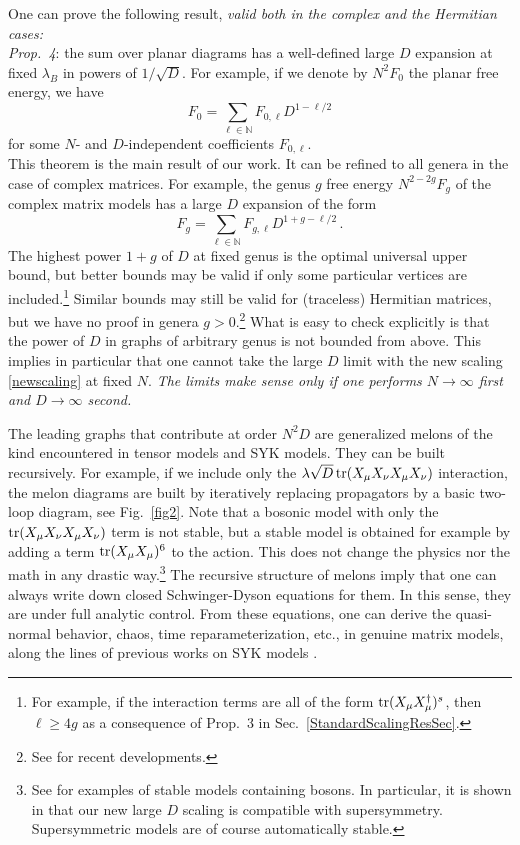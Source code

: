 \documentclass[12pt]{article}
\numberwithin{equation}{section}
\def\be{\begin{equation}}\def\ee{\end{equation}}
\begin{document}
One can prove the following result, \emph{valid both in the complex and the Hermitian cases:}\smallskip\\
\noindent\emph{Prop.\ 4}: the sum over planar diagrams has a well-defined large $D$ expansion at fixed $\lambda_{B}$ in powers of $1/\sqrt{D}$. For example, if we denote by $N^{2}F_{0}$ the planar free energy, we have
%
\be\label{F0exp} F_{0}=\sum_{\ell\in\mathbb N}F_{0,\ell}D^{1-\ell/2}\ee
%
for some $N$- and $D$-independent coefficients $F_{0,\ell}$.\smallskip\\
This theorem is the main result of our work. It can be refined to all genera in the case of complex matrices. For example, the genus $g$ free energy $N^{2-2g}F_{g}$ of the complex matrix models has a large $D$ expansion of the form
%
\be\label{Fgexpnew} F_{g}=\sum_{\ell\in\mathbb N}F_{g,\ell}D^{1+g-\ell/2}\, .\ee
%
The highest power $1+g$ of $D$ at fixed genus is the optimal universal upper bound, but better bounds may be valid if only some particular vertices are included.\footnote{For example, if the interaction terms are all of the form $\mathop{\rm tr}\nolimits (X_{\mu}X_{\mu}^{\dagger})^{s}$, then $\ell\geq 4g$ as a consequence of Prop.\ 3 in Sec.\ \ref{StandardScalingResSec}.} Similar bounds may still be valid for (traceless) Hermitian matrices, but we have no proof in genera $g>0$.\footnote{See \cite{Hermitiantrace,Fermult} for recent developments.} What is easy to check explicitly is that the power of $D$ in graphs of arbitrary genus is not bounded from above. This implies in particular that one cannot take the large $D$ limit with the new scaling \eqref{newscaling} at fixed $N$. \emph{The limits make sense only if one performs $N\rightarrow\infty$ first and $D\rightarrow\infty$ second.}

The leading graphs that contribute at order $N^{2}D$ are generalized melons of the kind encountered in tensor models and SYK models. They can be built recursively. For example, if we include only the $\lambda\sqrt{D}\mathop{\rm tr}\nolimits (X_{\mu}X_{\nu}X_{\mu}X_{\nu})$ interaction, the melon diagrams are built by iteratively replacing propagators by a basic two-loop diagram, see Fig.\ \ref{fig2}. Note that a bosonic model with only the $\mathop{\rm tr}\nolimits (X_{\mu}X_{\nu}X_{\mu}X_{\nu})$ term is not stable, but a stable model is obtained for example by adding a term $\mathop{\rm tr}\nolimits (X_{\mu}X_{\mu})^{6}$ to the action. This does not change the physics nor the math in any drastic way.\footnote{See \cite{Fermult} for examples of stable models containing bosons. In particular, it is shown in \cite{Fermult} that our new large $D$ scaling is compatible with supersymmetry. Supersymmetric models are of course automatically stable.} The recursive structure of melons imply that one can always write down closed Schwinger-Dyson equations for them. In this sense, they are under full analytic control. From these equations, one can derive the quasi-normal behavior, chaos, time reparameterization, etc., in genuine matrix models, along the lines of previous works on SYK models \cite{Kitaevetal}.
\end{document}
